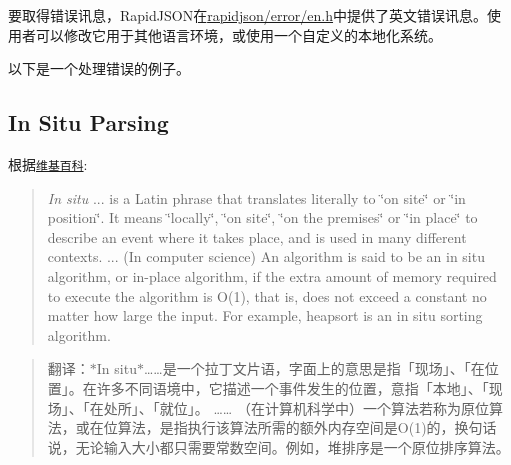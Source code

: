 要取得错误讯息，\+Rapid\+J\+S\+O\+N在{\ttfamily \hyperlink{en_8h_source}{rapidjson/error/en.\+h}}中提供了英文错误讯息。使用者可以修改它用于其他语言环境，或使用一个自定义的本地化系统。

以下是一个处理错误的例子。


\hypertarget{md_Commun_Externe_RapidJSON_doc_dom.zh-cn_InSituParsing}{}\subsection{In Situ Parsing}\label{md_Commun_Externe_RapidJSON_doc_dom.zh-cn_InSituParsing}
根据\href{http://en.wikipedia.org/wiki/In_situ}{\tt 维基百科}\+:

\begin{quote}
{\itshape In situ} ... is a Latin phrase that translates literally to \char`\"{}on site\char`\"{} or \char`\"{}in position\char`\"{}. It means \char`\"{}locally\char`\"{}, \char`\"{}on site\char`\"{}, \char`\"{}on the premises\char`\"{} or \char`\"{}in place\char`\"{} to describe an event where it takes place, and is used in many different contexts. ... (In computer science) An algorithm is said to be an in situ algorithm, or in-\/place algorithm, if the extra amount of memory required to execute the algorithm is O(1), that is, does not exceed a constant no matter how large the input. For example, heapsort is an in situ sorting algorithm. \end{quote}


\begin{quote}
翻译：$\ast$\+In situ$\ast$……是一个拉丁文片语，字面上的意思是指「现场」、「在位置」。在许多不同语境中，它描述一个事件发生的位置，意指「本地」、「现场」、「在处所」、「就位」。 …… （在计算机科学中）一个算法若称为原位算法，或在位算法，是指执行该算法所需的额外内存空间是\+O(1)的，换句话说，无论输入大小都只需要常数空间。例如，堆排序是一个原位排序算法。 \end{quote}


